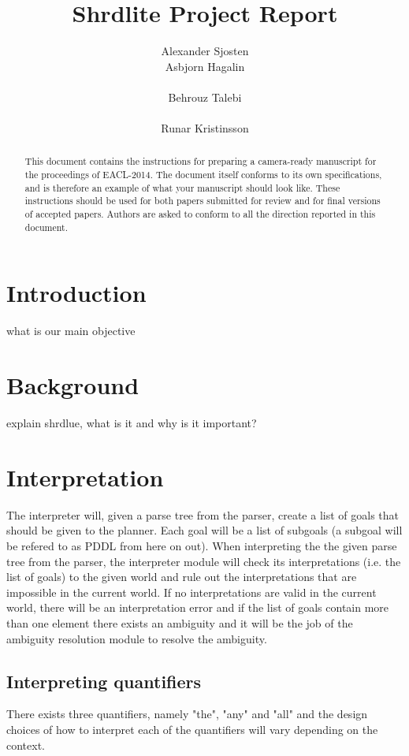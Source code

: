 \documentclass[11pt]{article}
\title{Shrdlite Project Report}
\author{Alexander Sjosten
  \\\And
  Asbjorn Hagalin \\
  \\\And
  Behrouz Talebi  \\
  \\\And
  Runar Kristinsson \\}
\date{}
\begin{document}
\maketitle
\begin{abstract}
This document contains the instructions for preparing a camera-ready manuscript for the proceedings of EACL-2014. The document itself conforms to its own specifications, and is therefore an example of what your manuscript should look like. These instructions should be used for both papers submitted for review and for final versions of accepted papers. Authors are asked to conform to all the direction reported in this document.
\end{abstract}


\section*{Introduction}
what is our main objective


\section*{Background}
 explain shrdlue, what is it and why is it important?


\section*{Interpretation}
The interpreter will, given a parse tree from the parser, create a list of goals that should be given to the planner. Each goal will be a list of subgoals (a subgoal will be refered to as PDDL from here on out). When interpreting the the given parse tree from the parser, the interpreter module will check its interpretations (i.e. the list of goals) to the given world and rule out the interpretations that are impossible in the current world. If no interpretations are valid in the current world, there will be an interpretation error and if the list of goals contain more than one element there exists an ambiguity and it will be the job of the ambiguity resolution module to resolve the ambiguity.

\subsection*{Interpreting quantifiers}
There exists three quantifiers, namely "the", "any" and "all" and the design choices of how to interpret each of the quantifiers will vary depending on the context.
\end{document}
